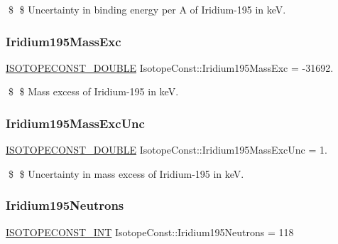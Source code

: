 \$ \$ Uncertainty in binding energy per A of Iridium-\/195 in keV. \mbox{\label{group___isotope_const-_iridium-_ir195_gab930d2aa3cd931a05397fb44af3555fd}} 
\subsubsection{\texorpdfstring{Iridium195\+Mass\+Exc}{Iridium195MassExc}}
{\footnotesize\ttfamily \mbox{\hyperlink{group___isotope_const-_macros_ga8f45a7272ce02c0b4c65c44636ed719a}{I\+S\+O\+T\+O\+P\+E\+C\+O\+N\+S\+T\+\_\+\+D\+O\+U\+B\+LE}} Isotope\+Const\+::\+Iridium195\+Mass\+Exc = -\/31692.}

\$ \$ Mass excess of Iridium-\/195 in keV. \mbox{\label{group___isotope_const-_iridium-_ir195_ga8dbb8cad5d304702bbd8c9fb74be722e}} 
\subsubsection{\texorpdfstring{Iridium195\+Mass\+Exc\+Unc}{Iridium195MassExcUnc}}
{\footnotesize\ttfamily \mbox{\hyperlink{group___isotope_const-_macros_ga8f45a7272ce02c0b4c65c44636ed719a}{I\+S\+O\+T\+O\+P\+E\+C\+O\+N\+S\+T\+\_\+\+D\+O\+U\+B\+LE}} Isotope\+Const\+::\+Iridium195\+Mass\+Exc\+Unc = 1.}

\$ \$ Uncertainty in mass excess of Iridium-\/195 in keV. \mbox{\label{group___isotope_const-_iridium-_ir195_gafe2023d61adbbb63f7ee08d7fc460510}} 
\subsubsection{\texorpdfstring{Iridium195\+Neutrons}{Iridium195Neutrons}}
{\footnotesize\ttfamily \mbox{\hyperlink{group___isotope_const-_macros_ga5f18360b3e99483a35c32d789e62621c}{I\+S\+O\+T\+O\+P\+E\+C\+O\+N\+S\+T\+\_\+\+I\+NT}} Isotope\+Const\+::\+Iridium195\+Neutrons = 118}

